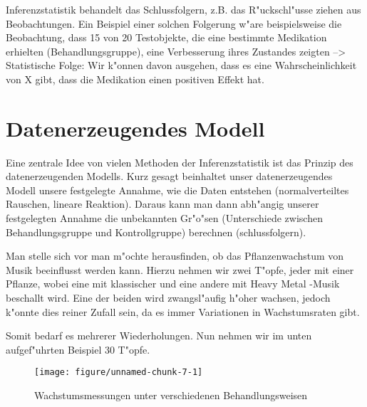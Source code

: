\documentclass[a4paper,twoside]{tufte-book}\usepackage[]{graphicx}\usepackage[]{color}
\makeatletter
\def\maxwidth{ %
  \ifdim\Gin@nat@width>\linewidth
    \linewidth
  \else
    \Gin@nat@width
  \fi
}
\makeatother
\begin{document}
Inferenzstatistik behandelt das Schlussfolgern, z.B. das R"uckschl"usse ziehen aus Beobachtungen. Ein Beispiel einer solchen Folgerung w"are beispielsweise die Beobachtung, dass 15 von 20 Testobjekte, die eine bestimmte Medikation erhielten (Behandlungsgruppe), eine Verbesserung ihres Zustandes zeigten --> Statistische Folge: Wir k"onnen davon ausgehen, dass es eine Wahrscheinlichkeit von X gibt, dass die Medikation einen positiven Effekt hat.


\section{Datenerzeugendes Modell}


Eine zentrale Idee von vielen Methoden der Inferenzstatistik ist das Prinzip des datenerzeugenden Modells. Kurz gesagt beinhaltet unser datenerzeugendes Modell unsere festgelegte Annahme, wie die Daten entstehen (normalverteiltes Rauschen, lineare Reaktion). Daraus kann man dann abh"angig unserer festgelegten Annahme die unbekannten Gr"o"sen (Unterschiede zwischen Behandlungsgruppe und Kontrollgruppe) berechnen (schlussfolgern).


Man stelle sich vor man m"ochte herausfinden, ob das Pflanzenwachstum von Musik beeinflusst werden kann. Hierzu nehmen wir zwei T"opfe, jeder mit einer Pflanze, wobei eine mit klassischer und eine andere mit Heavy Metal -Musik beschallt wird. Eine der beiden wird zwangsl"aufig h"oher wachsen, jedoch k"onnte dies reiner Zufall sein, da es immer Variationen in Wachstumsraten gibt.

Somit bedarf es mehrerer Wiederholungen. Nun nehmen wir im unten aufgef"uhrten Beispiel 30 T"opfe.

\begin{figure}[htbp]
\begin{center}
\begin{Schunk}

\texttt{[image: figure/unnamed-chunk-7-1]} \end{Schunk}
\caption{Wachstumsmessungen unter verschiedenen Behandlungsweisen}
\label{fig: plant growth music}
\end{center}
\end{figure}
\end{document}
